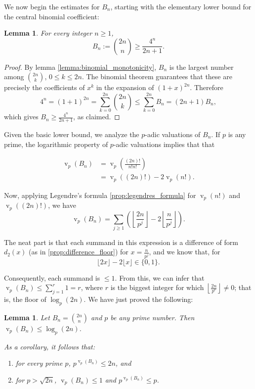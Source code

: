\documentclass[11pt]{article}
\newtheorem{lemma}[theorem]{Lemma}
\theoremstyle{remark}
\newcommand{\floor}[1]{\left\lfloor #1 \right\rfloor}
\newcommand{\vs}{\vspace{10px}}
\DeclareMathOperator{\val}{v}
\DeclareMathOperator{\vv}{v}
\begin{document}
We now begin the estimates for $B_n$, starting with the elementary lower bound for the central binomial coefficient:

\begin{lemma} \label{lemma:lower_bound_bn}
For every integer $n\geq 1$,
\[
B_n:=\binom{2n}{n}\geq \frac{4^n}{2n+1}.
\]
\end{lemma}

\begin{proof}
By lemma \ref{lemma:binomial_monotonicity}, $B_n$ is the largest number among $\binom{2n}{k}$, $0\le k\le 2n$. The binomial theorem guarantees that these are precisely the coefficients of $x^k$ in the
expansion of $(1+x)^{2n}$. Therefore
\[
4^n
=(1+1)^{2n}
=\sum_{k=0}^{2n}\binom{2n}{k}
\leq \sum_{k=0}^{2n}B_n = (2n+1)B_n,
\]
which gives $B_n\ge \frac{4^n}{2n+1}$, as claimed.
\end{proof}
\vs

Given the basic lower bound, we analyze the $p$-adic valuations of $B_n$. If $p$ is any prime, the logarithmic property of $p$-adic valuations implies that that

\begin{align*}
    \val_p(B_n)&=\val_p\left(\frac{(2n)!}{n!n!}\right)\\
    &=\val_p((2n)!)-2\val_p(n!).
\end{align*}

Now, applying Legendre's formula \ref{prop:legendres_formula} for $\val_p(n!)$ and $\val_p((2n)!)$, we have
\[
\val_p(B_n)
=
\sum_{j\geq1}
\left(
\left\lfloor\frac{2n}{p^j}\right\rfloor
-
2\left\lfloor\frac{n}{p^j}\right\rfloor
\right).
\]


The neat part is that each summand in this expression is a difference of form $d_2(x)$ (as in \ref{prop:difference_floor}) for $x=\frac{n}{p^j}$, and we know that, for 
\[
\lfloor 2x\rfloor-2\lfloor x\rfloor\in\{0,1\}.
\]

Consequently, each summand is $\le 1$. From this, we can infer that $\val_p(B_n)\le \sum\limits_{j=1}^r 1= r$, where $r$ is the biggest integer for which $\floor{\frac{2n}{p^r}}\ne 0$; that is, the floor of $\log_p(2n)$. We have just proved the following: 

\begin{lemma}\label{lemma:inequality_factors_bn}
    Let $B_n = \binom{2n}{n}$ and $p$ be any prime number. Then $\val_p(B_n)\le \log_p(2n)$.

    As a corollary, it follows that:

    \begin{enumerate}
        \item for every prime $p$, $p^{\vv_p(B_n)}\le 2n$, and
        \item for $p > \sqrt{2n}$, $\vv_p(B_n)\le 1$ and $p^{\vv_p(B_n)}\le p$.
    \end{enumerate}
\end{lemma}
\end{document}
